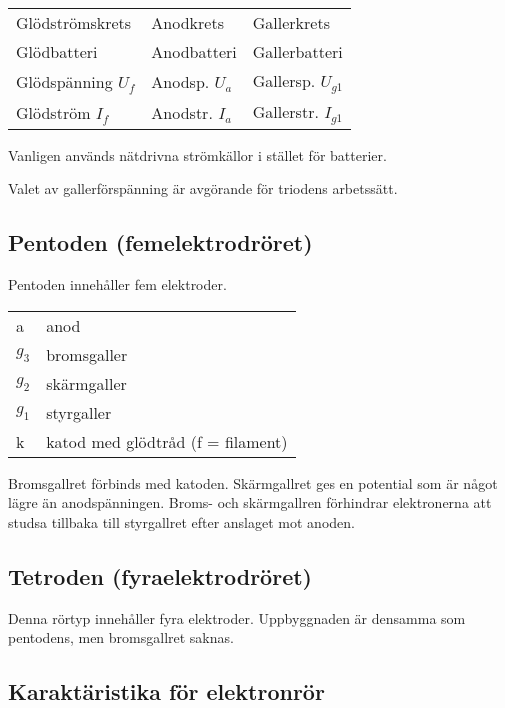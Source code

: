 \begin{tabular}{lll}
Glödströmskrets      & Anodkrets        &  Gallerkrets \\
Glödbatteri          & Anodbatteri      &  Gallerbatteri \\
Glödspänning \(U_f\) & Anodsp. \(U_a\)  &  Gallersp. \(U_{g1}\) \\
Glödström \(I_f\)    & Anodstr. \(I_a\) &  Gallerstr. \(I_{g1}\) \\
\end{tabular}

Vanligen används nätdrivna strömkällor i stället för batterier.

Valet av gallerförspänning är avgörande för triodens arbetssätt.

\newpage

\subsection{Pentoden (femelektrodröret)}

Pentoden innehåller fem elektroder.

\begin{tabular}{ll}
  a       & anod \\
  \(g_3\) & bromsgaller \\
  \(g_2\) & skärmgaller \\
  \(g_1\) & styrgaller \\
  k      & katod med glödtråd (f = filament) \\
\end{tabular}

Bromsgallret förbinds med katoden. Skärmgallret ges en potential som är något
lägre än anodspänningen.
Broms- och skärmgallren förhindrar elektronerna att studsa tillbaka till
styrgallret efter anslaget mot anoden.


\subsection{Tetroden (fyraelektrodröret)}

Denna rörtyp innehåller fyra elektroder. Uppbyggnaden är densamma som pentodens,
men bromsgallret saknas.

\subsection{Karaktäristika för elektronrör}

